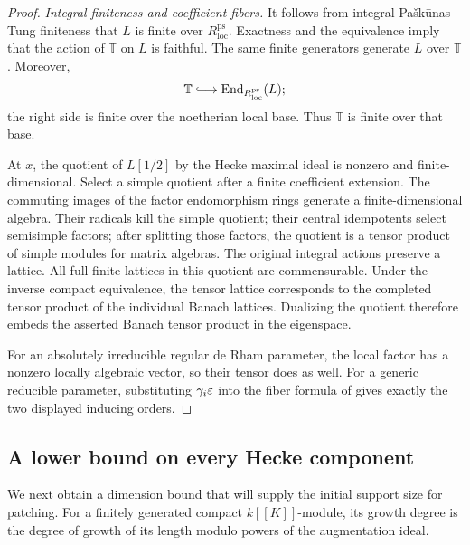 \begin{proof}
\emph{Integral finiteness and coefficient fibers.}
It follows from integral Pa\v{s}k\=unas--Tung finiteness
that \(L\) is finite over
\(R_{\mathrm{loc}}^{\mathrm{ps}}\).
Exactness and the equivalence imply that the action of
\(\mathbb T\) on \(L\) is faithful. The same finite
generators generate \(L\) over \(\mathbb T\).
Moreover,
\[
 \mathbb T\lhook\joinrel\longrightarrow
 \End_{R_{\mathrm{loc}}^{\mathrm{ps}}}(L);
\]
the right side is finite over the noetherian local base.
Thus \(\mathbb T\) is finite over that base.

At \(x\), the quotient of \(L[1/2]\) by the Hecke maximal
ideal is nonzero and finite-dimensional. Select a simple
quotient after a finite coefficient extension. The
commuting images of the factor endomorphism rings generate
a finite-dimensional algebra. Their radicals kill the
simple quotient; their central idempotents select
semisimple factors; after splitting those factors, the
quotient is a tensor product of simple modules for matrix
algebras. The original integral actions preserve a
lattice. All full finite lattices in this quotient are
commensurable. Under the inverse compact equivalence,
the tensor lattice corresponds to the completed tensor
product of the individual Banach lattices. Dualizing
the quotient therefore embeds the asserted Banach
tensor product in the eigenspace.

For an absolutely irreducible regular de Rham parameter,
the local factor has a nonzero locally algebraic vector,
so their tensor does as well. For a generic reducible
parameter, substituting
\(\gamma_i\varepsilon\) into the fiber formula of
\cite[Corollary~6.10]{PaskunasTung2021} gives exactly the
two displayed inducing orders.
\end{proof}

\subsection{A lower bound on every Hecke component}

We next obtain a dimension bound that will supply the
initial support size for patching. For a finitely
generated compact \(k[[K]]\)-module, its growth degree is
the degree of growth of its length modulo powers of
the augmentation ideal.


